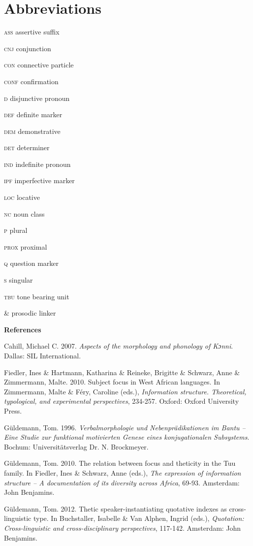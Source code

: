 \documentclass[output=paper]{langsci/langscibook}
\begin{document}
\section{ Abbreviations}

\textsc{ass}  assertive suffix

\textsc{cnj}  conjunction

\textsc{con}  connective particle

\textsc{conf}  confirmation

\textsc{d}  disjunctive pronoun

\textsc{def}  definite marker

\textsc{dem}  demonstrative

\textsc{det}  determiner

\textsc{ind}  indefinite pronoun

\textsc{ipf}  imperfective marker

\textsc{loc}  locative

\textsc{nc}  noun class

\textsc{p}  plural

\textsc{prox}  proximal

\textsc{q}  question marker

\textsc{s}  singular

\textsc{tbu}  tone bearing unit

\& prosodic linker

\textbf{References}

Cahill, Michael C. 2007. \textit{Aspects of the morphology and phonology of Kɔnni}. Dallas: SIL International.

Fiedler, Ines \& Hartmann, Katharina \& Reineke, Brigitte \& Schwarz, Anne \& Zimmermann, Malte. 2010. Subject focus in West African languages. In Zimmermann, Malte \& Féry, Caroline (eds.), \textit{Information structure. Theoretical, typological, and experimental perspectives}, 234-257. Oxford: Oxford University Press.

Güldemann, Tom. 1996. \textit{Verbalmorphologie und Nebenprädikationen im Bantu – Eine Studie zur funktional motivierten Genese eines konjugationalen Subsystems}. Bochum: Universitätsverlag Dr. N. Brockmeyer.

Güldemann, Tom. 2010. The relation between focus and theticity in the Tuu family. In Fiedler, Ines  \& Schwarz, Anne (eds.), \textit{The expression of information structure – A documentation of its diversity across Africa}, 69-93. Amsterdam: John Benjamins.

Güldemann, Tom. 2012. Thetic speaker-instantiating quotative indexes as cross-linguistic type. In Buchstaller, Isabelle \& Van Alphen, Ingrid (eds.), \textit{Quotation: Cross-linguistic and cross-disciplinary perspectives}, 117-142. Amsterdam: John Benjamins.
\end{document}
